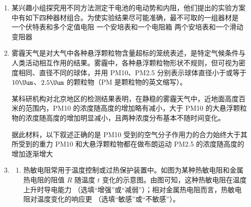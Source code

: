 \documentclass[\gkver]{gaokaozhenti}
\begin{document}
\begin{enumerate}
\item
某兴趣小组探究用不同方法测定干电池的电动势和内阻，他们提出的实验方案中有如下四种器材组合。为使实验结果尽可能准确，最不可取的一组器材是
{一个伏特表和多个定值电阻}
{一个安培表和一个电阻箱}
{两个安培表和一个滑动变阻器}

\item
雾霾天气是对大气中各种悬浮颗粒物含量超标的笼统表述，是特定气候条件与人类活动相互作用的结果。雾霾中，各种悬浮颗粒物形状不规则，但可视为密度相同、直径不同的球体，并用 PM10、PM2.5 分别表示球体直径小于或等于 $10\Uum$、$2.5\Uum$ 的颗粒物（PM 是颗粒物的英文缩写）。

某科研机构对北京地区的检测结果表明，在静稳的雾霾天气中，近地面高度百米的范围内，PM10 的浓度随高度的增加略有减小，大于 PM10 的大悬浮颗粒物的浓度随高度的增加明显减小，且两种浓度分布基本不随时间变化。

据此材料，以下叙述正确的是
{PM10 受到的空气分子作用力的合力始终大于其所受到的重力}
{PM10 和大悬浮颗粒物都在做布朗运动}
{PM2.5 的浓度随高度的增加逐渐增大}

\item
\begin{enumerate}
	\item
	热敏电阻常用于温度控制或过热保护装置中。如图为某种热敏电阻和金属热电阻的阻值 $R$ 随温度 $t$ 变化的示意图。由图可知，这种热敏电阻在温度上升时导电能力 （选填“增强”或“减弱”）；相对金属热电阻而言，热敏电阻对温度变化的响应更 （选填“敏感”或“不敏感”）。
	\onepicture[align=right, w=3.71cm]{}


\end{enumerate}
\end{enumerate}
\end{document}
